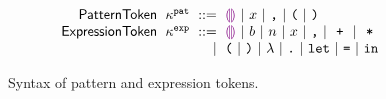 \begin{figure}
  \vspace{-3px}
  \[
  \arraycolsep=3pt\begin{array}{rlrl}
      \mathsf{PatternToken} & \token^{\pat} & ::= &
        \shole ~\vert~
        \svar{x} ~\vert~
        \sprod{}{} ~\vert~
        \texttt{(} ~\vert~
        \texttt{)} \\
      \mathsf{ExpressionToken} & \token^{\expr} & ::= &
        \shole ~\vert~
        \sboollit{b} ~\vert~
        \snumlit{n} ~\vert~
        \svar{x} ~\vert~
        \sprod{}{} ~\vert~
        \splus{}{} ~\vert~
        \smult{}{} \\
      & & \vert &
        \texttt{(} ~\vert~
        \texttt{)} ~\vert~
        \lambda ~\vert~
        \texttt{.} ~\vert~
        \texttt{let} ~\vert~
        \texttt{=} ~\vert~
        \texttt{in}
  \end{array}\]
  \caption{
    Syntax of pattern and expression tokens.
  }
  \label{fig:token-syntax}
\end{figure}